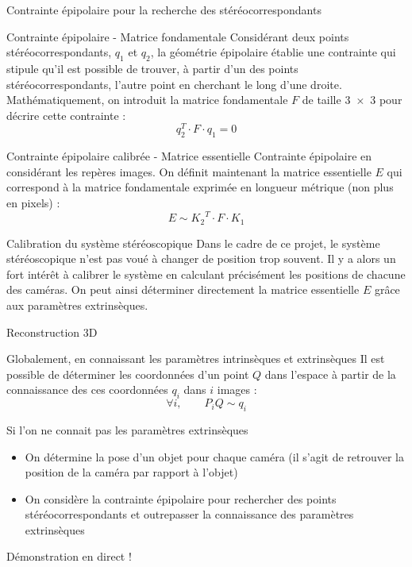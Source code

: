 \documentclass[8pt]{beamer}
\begin{document}
	\begin{frame}{Contrainte épipolaire pour la recherche des stéréocorrespondants}
		\begin{block}{Contrainte épipolaire - Matrice fondamentale}
			Considérant deux points stéréocorrespondants, $q_1$ et $q_2$, la géométrie épipolaire établie une contrainte qui stipule qu'il est possible de trouver, à partir d'un des points stéréocorrespondants, l'autre point en cherchant le long d'une droite.
			\\Mathématiquement, on introduit la matrice fondamentale $F$ de taille \num{3x3} pour décrire cette contrainte :
			$$
			q_2^T \cdot F \cdot q_1 = 0
			$$
		\end{block}
		\begin{block}{Contrainte épipolaire calibrée - Matrice essentielle}
			Contrainte épipolaire en considérant les repères images. On définit maintenant la matrice essentielle $E$ qui correspond à la matrice fondamentale exprimée en longueur métrique (non plus en pixels) :
			$$
			E \sim {K_2}^T \cdot F \cdot K_1
			$$
		\end{block}
		\begin{block}{Calibration du système stéréoscopique}
			Dans le cadre de ce projet, le système stéréoscopique n'est pas voué à changer de position trop souvent. Il y a alors un fort intérêt à calibrer le système en calculant précisément les positions de chacune des caméras. On peut ainsi déterminer directement la matrice essentielle $E$ grâce aux paramètres extrinsèques.
		\end{block}
	\end{frame}
	\begin{frame}{Reconstruction 3D}
		\begin{block}{Globalement, en connaissant les paramètres intrinsèques et extrinsèques}
			Il est possible de déterminer les coordonnées d'un point $Q$ dans l'espace à partir de la connaissance des ces coordonnées $q_i$ dans $i$ images :
			$$
			\forall i,\qquad P_iQ \sim q_i
			$$
		\end{block}
		\begin{block}{Si l'on ne connait pas les paramètres extrinsèques}
			\begin{itemize}
				\item On détermine la pose d'un objet pour chaque caméra (il s'agit de retrouver la position de la caméra par rapport à l'objet)
				\item On considère la contrainte épipolaire pour rechercher des points stéréocorrespondants et outrepasser la connaissance des paramètres extrinsèques
			\end{itemize}
		\end{block}\vspace{1em}
		\begin{center}
			Démonstration en direct !
		\end{center}
	\end{frame}
\end{document}
